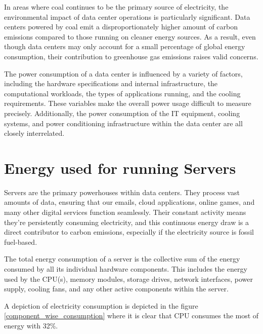 \documentclass[
  a4paper,  %
  twoside,  %
  bibliography=totoc,
  headsepline,
  cleardoublepage=empty,
  parskip=half,
  draft=false
]{scrbook}
\begin{document}
In areas where coal continues to be the primary source of electricity, the environmental impact of data center operations is particularly significant\cite{finkelman2021future}. Data centers powered by coal emit a disproportionately higher amount of carbon emissions compared to those running on cleaner energy sources. As a result, even though data centers may only account for a small percentage of global energy consumption, their contribution to greenhouse gas emissions raises valid concerns.



The power consumption of a data center is influenced by a variety of factors, including the hardware specifications and internal infrastructure, the computational workloads, the types of applications running, and the cooling requirements\cite{dayarathna2015data}. These variables make the overall power usage difficult to measure precisely. Additionally, the power consumption of the IT equipment, cooling systems, and power conditioning infrastructure within the data center are all closely interrelated.


\section{Energy used for running Servers}

Servers are the primary powerhouses within data centers. They process vast amounts of data, ensuring  that  our  emails,  cloud  applications, online games, and many other digital services function seamlessly\cite{techtargetMajorServer}. Their constant  activity means they're persistently consuming electricity\cite{energyinnovationMuchEnergy}, and this continuous energy draw is a direct contributor to carbon emissions, especially if the electricity source is fossil fuel-based.

The total energy consumption of a server is the collective sum of the energy consumed by all its individual hardware components. This includes the energy used by the CPU(s), memory modules, storage drives, network interfaces, power supply, cooling fans, and any other active components within the server\cite{ahmed2021review}. 


A depiction of electricity consumption is depicted in the figure \ref{component_wise_consumption} where it is clear that CPU consumes the most of energy with 32\%.
\end{document}
